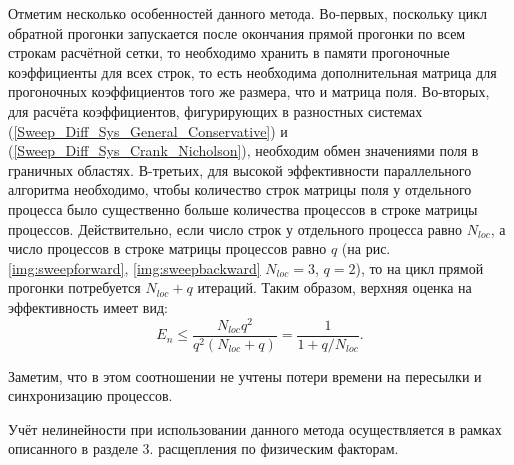 Отметим несколько особенностей данного метода.
Во-первых, поскольку цикл обратной прогонки запускается после окончания прямой прогонки по всем строкам расчётной сетки, то необходимо хранить в памяти прогоночные коэффициенты для всех строк, то есть необходима дополнительная матрица для прогоночных коэффициентов того же размера, что и матрица поля.
Во-вторых, для расчёта коэффициентов, фигурирующих в разностных системах (\ref{Sweep_Diff_Sys_General_Conservative}) и (\ref{Sweep_Diff_Sys_Crank_Nicholson}), необходим обмен значениями поля в граничных областях.
В-третьих, для высокой эффективности параллельного алгоритма необходимо, чтобы количество строк матрицы поля у отдельного процесса было существенно больше количества процессов в строке матрицы процессов.
Действительно, если число строк у отдельного процесса равно $N_{loc}$, а число процессов в строке матрицы процессов равно $q$
(на рис. \ref{img:sweepforward}, \ref{img:sweepbackward} $N_{loc}=3$, $q=2$), то на цикл прямой прогонки потребуется $N_{loc}+q$ итераций.
Таким образом, верхняя оценка на эффективность имеет вид:
\begin{equation}
    E_n\leqslant\frac{N_{loc}q^2}{q^2(N_{loc} + q)}=\frac{1}{1+q/N_{loc}}.
\end{equation}

Заметим, что в этом соотношении не учтены потери времени на пересылки и синхронизацию процессов.

Учёт нелинейности при использовании данного метода осуществляется в рамках описанного в разделе 3. расщепления по физическим факторам.
